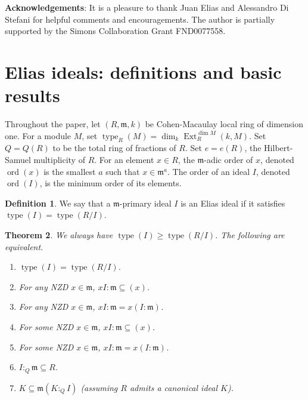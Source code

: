 \documentclass[a4paper,12pt]{amsart}
\newtheorem{thm}{\bf Theorem}[section]
\theoremstyle{definition}
\newtheorem{definition}[thm]{\bf Definition}
\theoremstyle{remark}
\numberwithin{equation}{section}
\DeclareMathOperator{\type}{{type}}
\DeclareMathOperator{\Ext}{{Ext}}
\DeclareMathOperator{\ord}{{ord}}
\def\fm{\mathfrak{m}}
\begin{document}
\noindent\textbf{Acknowledgements}: It is a pleasure to thank Juan Elias and Alessandro Di Stefani for helpful comments and encouragements. The author is partially supported by the Simons Collaboration Grant FND0077558. 

\section{Elias ideals: definitions and basic results}\label{sec1} 

Throughout the paper, let $(R,\fm, k)$ be Cohen-Macaulay local ring of dimension one. For a module $M$, set $\type_R(M) = \dim_k\Ext^{\dim M}_R(k,M)$. Set $Q=Q(R)$  to be the total ring of fractions of $R$. Set $e=e(R)$, the Hilbert-Samuel multiplicity of $R$. For an element $x\in R$, the $\fm$-adic order of $x$, denoted $\ord(x)$ is the smallest $a$ such that $x\in \fm^a$. The order of an ideal $I$, denoted $\ord(I)$, is the minimum order of its elements. 



\begin{definition}
We say that a $\fm$-primary ideal $I$ is an  Elias ideal if it satisfies  $\type(I) = \type(R/I)$. 
\end{definition}




\begin{thm}\label{thmEli}
We always have $\type(I)\geq \type(R/I)$. The following are equivalent. 

\begin{enumerate}
\item $\type(I) = \type(R/I)$.  
\item For any NZD $x \in \fm$, $xI:\fm\subseteq (x)$.
\item For any NZD $x \in \fm$, $xI:\fm = x(I:\fm)$.
\item For some NZD $x \in \fm$, $xI:\fm\subseteq (x)$.
\item  For some NZD $x \in \fm$, $xI:\fm = x(I:\fm)$.
\item $I:_Q\fm\subseteq R$. 
\item $K\subseteq \fm(K:_Q I)$ (assuming $R$ admits a canonical ideal $K$). 
\end{enumerate}

\end{thm}
\end{document}
